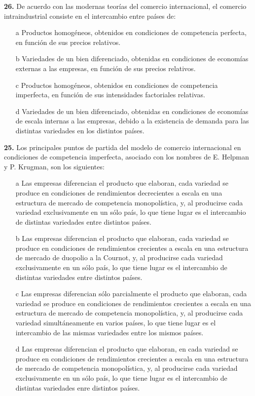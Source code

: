 \documentclass{nuevotema}
\begin{document}
\textbf{26.} De acuerdo con las modernas teorías del comercio internacional, el comercio intraindustrial consiste en el intercambio entre países de:
\begin{itemize}
	\item[a] Productos homogéneos, obtenidos en condiciones de competencia perfecta, en función de sus precios relativos.
	\item[b] Variedades de un bien diferenciado, obtenidas en condiciones de economías externas a las empresas, en función de sus precios relativos.
	\item[c] Productos homogéneos, obtenidos en condiciones de competencia imperfecta, en función de sus intensidades factoriales relativas.
	\item[d] Variedades de un bien diferenciado, obtenidas en condiciones de economías de escala internas a las empresas, debido a la existencia de demanda para las distintas variedades en los distintos países.
\end{itemize}

\textbf{25.} Los principales puntos de partida del modelo de comercio internacional en condiciones de competencia imperfecta, asociado con los nombres de E. Helpman y P. Krugman, son los siguientes:
\begin{itemize}
	\item[a] Las empresas diferencian el producto que elaboran, cada variedad se produce en condiciones de rendimientos decrecientes a escala en una estructura de mercado de competencia monopolística, y, al producirse cada variedad exclusivamente en un sólo país, lo que tiene lugar es el intercambio de distintas variedades entre distintos países.
	\item[b] Las empresas diferencian el producto que elaboran, cada variedad se produce en condiciones de rendimientos crecientes a escala en una estructura de mercado de duopolio a la Cournot, y, al producirse cada variedad exclusivamente en un sólo país, lo que tiene lugar es el intercambio de distintas variedades entre distintos países. 
	\item[c] Las empresas diferencian sólo parcialmente el producto que elaboran, cada variedad se produce en condiciones de rendimientos crecientes a escala en una estructura de mercado de competencia monopolística, y, al producirse cada variedad simultáneamente en varios países, lo que tiene lugar es el intercambio de las mismas variedades entre los mismos países.
	\item[d] Las empresas diferencian el producto que elaboran, en cada variedad se produce en condiciones de rendimientos crecientes a escala en una estructura de mercado de competencia monopolística, y, al producirse cada variedad exclusivamente en un sólo país, lo que tiene lugar es el intercambio de distintas variedades enre distintos países.
\end{itemize}
\end{document}
